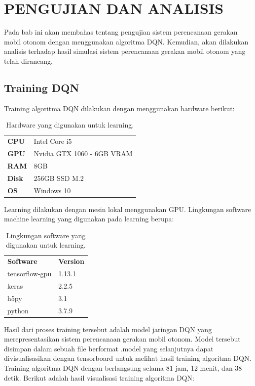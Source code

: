 \chapter{PENGUJIAN DAN ANALISIS}
\label{chap:pengujiananalisis}


Pada bab ini akan membahas tentang pengujian sistem perencanaan gerakan mobil otonom dengan menggunakan algoritma DQN. Kemudian, akan dilakukan analisis terhadap hasil simulasi sistem
perencanaan gerakan mobil otonom yang telah dirancang.

\section{Training DQN}
\label{sec:training_dqn}
Training algoritma DQN dilakukan dengan menggunakan hardware berikut:
\begin{table}[H]
	\begin{tabular}{ll}
		\textbf{CPU}  & Intel Core i5              \\
		\textbf{GPU}  & Nvidia GTX 1060 - 6GB VRAM \\
		\textbf{RAM}  & 8GB                        \\
		\textbf{Disk} & 256GB SSD M.2              \\
		\textbf{OS}   & Windows 10                
	\end{tabular}
\caption{Hardware yang digunakan untuk learning.}
\label{tb:hardwaresetup}
\end{table}

Learning dilakukan dengan mesin lokal menggunakan GPU. Lingkungan software machine learning yang digunakan pada learning berupa:

\begin{table}[H]
	\begin{tabular}{ll}
		\textbf{Software}  & \textbf{Version}              \\
		tensorflow-gpu  & 1.13.1	\\
		keras  & 2.2.5					\\
		h5py & 3.1              \\
		python & 3.7.9              \\
	\end{tabular}
	\caption{Lingkungan software yang digunakan untuk learning.}
	\label{tb:softwaresetup}
\end{table}


Hasil dari proses training tersebut adalah model jaringan DQN yang merepresentasikan sistem perencanaan gerakan mobil otonom. Model tersebut disimpan dalam sebuah file berformat .model yang
selanjutnya dapat divisualisasikan dengan tensorboard untuk melihat hasil training algoritma DQN. Training algoritma DQN dengan
berlangsung selama 81 jam, 12 menit, dan 38 detik. Berikut adalah hasil visualisasi training algoritma DQN:

